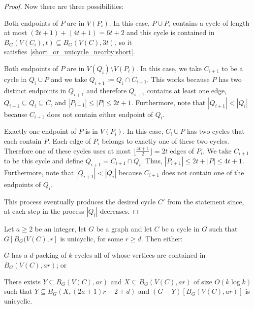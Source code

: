 \documentclass{patmorin}
\begin{document}
\begin{proof}
  Now there are three possibilities:
  \begin{compactenum}
    \item Both endpoints of $P$ are in $V(P_{i})$.
    In this case, $P\cup P_{i}$ contains a cycle of length at most
    $(2t+1)+(4t+1)=6t+2$ and this cycle is contained in $B_G(V(C_i),t)\subseteq B_G(V(C),3t)$, so it satisfies~\eqref{short_or_unicycle_nearby:short}.
    \item Both endpoints of $P$ are in $V(Q_{i})\setminus V(P_{i})$.
    In this case, we take $C_{i+1}$ to be a cycle in $Q_{i}\cup P$ and
    we take $Q_{i+1}:= Q_i\cap C_{i+1}$. %
    This works because $P$ has two distinct endpoints in $Q_{i+1}$
    and therefore $Q_{i+1}$ contains at least one edge,
    $Q_{i+1}\subseteq Q_i\subseteq C$, and
    $|P_{i+1}|\leq|P|\leq 2t+1$.
    Furthermore, note that $|Q_{i+1}| < |Q_{i}|$ because $C_{i+1}$ does not contain either endpoint of $Q_{i}$.
    \item Exactly one endpoint of $P$ is in $V(P_{i})$.
    In this case, $C_{i}\cup P$ has two cycles that each contain $P$.
    Each edge of $P_{i}$ belongs to exactly one of these two cycles.
    Therefore one of these cycles uses at most $\lfloor\frac{4t+1}{2}\rfloor=2t$ edges of $P_{i}$.
    We take $C_{i+1}$ to be this cycle and define
    $Q_{i+1}=C_{i+1}\cap Q_i$. %
    Thus, $|P_{i+1}| \leq 2t+|P|\leq 4t+1$.
    Furthermore, note that $|Q_{i+1}| < |Q_{i}|$ because $C_{i+1}$ does not contain one of the endpoints of $Q_{i}$.
  \end{compactenum}
  This process eventually produces the desired cycle $C'$ from the statement since, at each step in the process $|Q_i|$ decreases.
\end{proof}

\begin{lem}\label{grow_unicycle}
  Let $a\ge 2$ be an integer, let $G$ be a graph and let $C$ be a cycle in $G$ such that $G[B_G(V(C),r]$ is unicyclic, for some $r\ge d$.  Then either:
  \begin{compactenum}[(a)]
    \item $G$ has a $d$-packing of $k$ cycles all of whose vertices are contained in $B_G(V(C), ar)$; or
    \item There exists $Y\subseteq B_G(V(C),ar)$ and $X\subseteq B_G(V(C), ar)$ of size $O(k\log k)$ such that $Y\subseteq B_G(X,(2a+1)r+2+d)$ and $(G-Y)[B_G(V(C),ar)]$ is unicyclic.
  \end{compactenum}
\end{lem}
\end{document}

